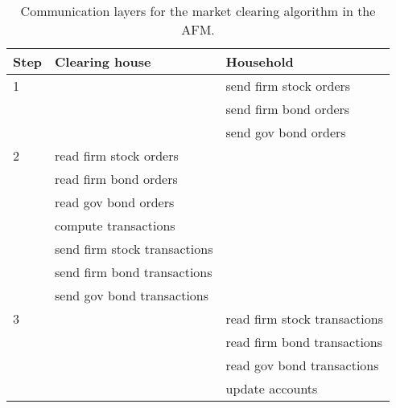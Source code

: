 \documentclass[a4paper,11pt]{article}
\begin{document}
\begin{table}
  \centering
  \begin{tabular}{|l|l|l|}
  \hline
  Step & Clearing house & Household \\
  \hline\hline
    1 &  & send firm stock orders  \\
      &  & send firm bond orders  \\
      &  & send gov bond orders  \\
    \hline
    2 & read firm stock orders &  \\
      & read firm bond orders  & \\
      & read gov bond orders   &  \\
      & compute transactions   &   \\
      & send firm stock transactions &  \\
      & send firm bond transactions  &  \\
      & send gov bond transactions   &  \\      
    \hline
    3 &  & read firm stock transactions  \\
      &  & read firm bond transactions   \\
      &  & read gov bond transactions    \\
      &  & update accounts\\
  \hline
  \end{tabular}
  \caption{Communication layers for the market clearing algorithm in the AFM.}
  \label{Table: messages}
\end{table}
\end{document}
